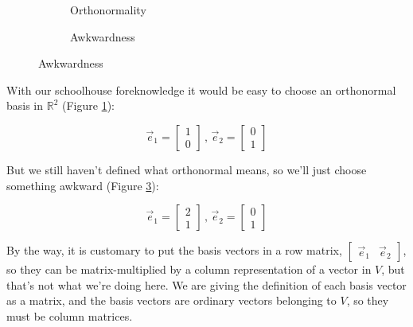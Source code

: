 \begin{figure}[h]
    \caption{Basis vectors in $\mathbb{R}^2$}
    \begin{subfigure}{0.5\textwidth}
        \centering
        \caption{Orthonormality} \label{fig:vectors-orthonormality}
    \end{subfigure}
    \begin{subfigure}{0.5\textwidth}
        \centering
        \caption{Awkwardness} \label{fig:vectors-awkwardness}
    \end{subfigure}
\end{figure}

With our schoolhouse foreknowledge it would be easy to choose an orthonormal basis in $\mathbb{R}^2$ (Figure \ref{fig:vectors-orthonormality}):

$$
\vec{e}_1 = \begin{bmatrix}1 \\ 0\end{bmatrix}\,,\,
\vec{e}_2 = \begin{bmatrix}0 \\ 1\end{bmatrix}
$$

But we still haven't defined what orthonormal means, so we'll just choose something awkward (Figure \ref{fig:vectors-awkwardness}):

$$
\vec{e}_1 = \begin{bmatrix}2 \\ 1\end{bmatrix}\,,\,
\vec{e}_2 = \begin{bmatrix}0 \\ 1\end{bmatrix}
$$

By the way, it is customary to put the basis vectors in a row matrix, $\begin{bmatrix}\vec{e}_1 & \vec{e}_2\end{bmatrix}$, so they can be matrix-multiplied by a column representation of a vector in $V$, but that's not what we're doing here. We are giving the definition of each basis vector as a matrix, and the basis vectors are ordinary vectors belonging to $V$, so they must be column matrices.

